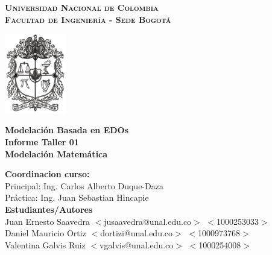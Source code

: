 \documentclass[11pt,stdletter,orderfromtodate,sigleft,twoside]{report}
\newcommand{\uncol}{Universidad Nacional de Colombia}
\newcommand{\facingbog}{Facultad de Ingeniería - Sede Bogotá}
\newcommand{\module}{Modelación Matemática}
\newcommand{\reportType}{Informe Taller 01}
\newcommand{\reportSubject}{Modelación Basada en EDOs}
\begin{document}


\begin{titlepage}
\center

\vspace*{-12mm}
{\huge \textbf{\textsc{\uncol}}}\\
{\Large \textbf{\textsc{\facingbog}}}\\[20mm]

\vfill

\includegraphics[width=0.2\textwidth]{./templateFigures/escudo.png}\\[20mm]

\vfill

\begin{framed}
{\Huge \textbf{\reportSubject}}\\[4mm]
{\huge \textbf{\reportType}}\\[4mm]
{\huge \textbf{\module}}
\end{framed}
\vspace{12mm}

\vfill

{\Large \textbf{Coordinacion curso:}}\\[4mm]
{\large Principal: Ing. Carlos Alberto Duque-Daza\\[2mm]
        Práctica: Ing. Juan Sebastian Hincapie}\\[12mm]

{\Large \textbf{Estudiantes/Autores}}\\[4mm]
{\large Juan Ernesto Saavedra  $<$jusaavedra@unal.edu.co$>$ $<$1000253033$>$}\\[2mm]
{\large Daniel Mauricio Ortiz $<$dortizi@unal.edu.co$>$ $<$1000973768$>$}\\[2mm]
{\large Valentina Galvis Ruiz $<$vgalvis@unal.edu.co$>$ $<$1000254008$>$}\\[12mm]




\end{titlepage}
\end{document}
